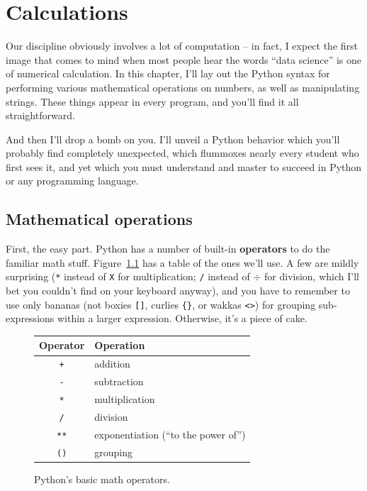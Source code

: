 
\chapter{Calculations}
\label{ch:calculations}

Our discipline obviously involves a lot of computation -- in fact, I expect the
first image that comes to mind when most people hear the words ``data science''
is one of numerical calculation. In this chapter, I'll lay out the Python
syntax for performing various mathematical operations on numbers, as well as
manipulating strings. These things appear in every program, and you'll find it
all straightforward.

And then I'll drop a bomb on you. I'll unveil a Python behavior which you'll
probably find completely unexpected, which flummoxes nearly every student who
first sees it, and yet which you must understand and master to succeed in
Python or any programming language.

\section{Mathematical operations}


First, the easy part. Python has a number of built-in \textbf{operators} to do
the familiar math stuff. Figure~\ref{fig:mathOps} has a table of the ones we'll
use. A few are mildly surprising (\texttt{*} instead of \texttt{X} for
multiplication; \texttt{/} instead of $\div$ for division, which I'll bet you
couldn't find on your keyboard anyway), and you have to remember to use only
bananas (not boxies \texttt{[]}, curlies \texttt{\{\}}, or wakkas \texttt{<>})
for grouping sub-expressions within a larger expression. Otherwise, it's a
piece of cake.

\begin{figure}[ht]
\centering
\begin{tabular}{c | l}
\hline
Operator & Operation \\
\hline
\texttt{+} & addition \\
\texttt{-} & subtraction \\
\texttt{*} & multiplication \\
\texttt{/} & division \\
\texttt{**} & exponentiation (``to the power of'')\\
\texttt{()} & grouping \\
\hline
\end{tabular}
\smallskip
\caption{Python's basic math operators.}
\label{fig:mathOps}
\end{figure}

